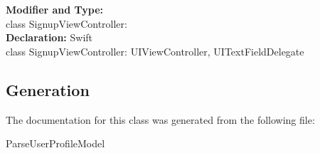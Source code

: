 \textbf{Modifier and Type:}\\
\tab class SignupViewController:\\

\textbf{Declaration:}
\tab 
Swift\\

class SignupViewController: UIViewController, UITextFieldDelegate\\







\subsection{Generation}
The documentation for this class was generated from the following file\-:
\begin{DoxyCompactItemize}
\item ParseUserProfileModel
\end{DoxyCompactItemize} 









